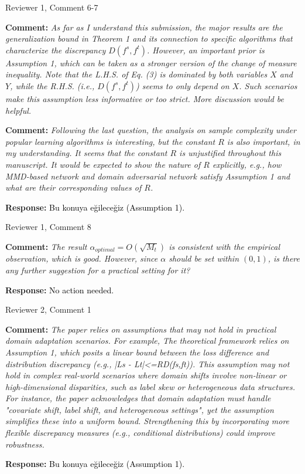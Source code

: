 \documentclass[11pt]{article}
\newcommand{\ReviewerText}[1]{%
    \begin{tcolorbox}[
        enhanced, frame hidden, colback=revbg,
        left=5pt, right=5pt, top=5pt, bottom=5pt, arc=2pt
    ]
        \textbf{\textcolor{revtitle}{Comment:}} 
        \itshape \textcolor{black!80}{#1}
    \end{tcolorbox}
    \vspace{0.05cm}
}
\newcommand{\AuthorResponse}[1]{%
    \begin{tcolorbox}[
        enhanced, frame hidden, colback=authbg,
        left=5pt, right=5pt, top=5pt, bottom=5pt, arc=2pt
    ]
        \textbf{\textcolor{authtitle}{Response:}} 
        \normalfont \textcolor{black}{#1}
    \end{tcolorbox}
    \vspace{0.1cm}
}
\newcommand{\AutoRevision}[1]{%
    \begin{tcolorbox}[
        enhanced, breakable,
        colback=revisionbg, frame hidden,
        borderline west={3pt}{0pt}{blue!40}, %
        left=5pt, right=5pt, top=5pt, bottom=5pt,
        arc=2pt 
    ]
        \textbf{\textcolor{blue!40!black}{Revisions in Manuscript:}}
        
        \renewcommand{\do}[1]{%
            \par\vspace{0.3cm} %
            
            {\small\bfseries\color{blue!60!black} $\hookrightarrow$ Section \ref{rev:##1}, Page \pageref{rev:##1}:}
            
            \par\nopagebreak
            \begingroup
            \itshape\small \Paste{text:##1}
            \endgroup
        }
        \docsvlist{#1} %
    \end{tcolorbox}
}
\begin{document}
\begin{ReviewCycle}{Reviewer 1, Comment 6-7}
    \ReviewerText{
        As far as I understand this submission, the major results are the generalization bound in Theorem 1 and its connection to specific algorithms that characterize the discrepancy $D(f^s,f^t)$. However, an important prior is Assumption 1, which can be taken as a stronger version of the change of measure inequality. Note that the L.H.S. of Eq. (3) is dominated by both variables $X$ and $Y$, while the R.H.S. (i.e., $D(f^s,f^t)$) seems to only depend on $X$. Such scenarios make this assumption less informative or too strict. More discussion would be helpful.
    }
    \ReviewerText{
        Following the last question, the analysis on sample complexity under popular learning algorithms is interesting, but the constant $R$ is also important, in my understanding. It seems that the constant $R$ is unjustified throughout this manuscript. It would be expected to show the nature of $R$ explicitly, e.g., how MMD-based network and domain adversarial network satisfy Assumption 1 and what are their corresponding values of $R$.
    }
    \AuthorResponse{Bu konuya eğileceğiz (Assumption 1).}
\end{ReviewCycle}

\begin{ReviewCycle}{Reviewer 1, Comment 8}
    \ReviewerText{
        The result $\alpha_{optimal}=O(\sqrt{M_t})$ is consistent with the empirical observation, which is good. However, since $\alpha$ should be set within $(0,1)$, is there any further suggestion for a practical setting for it?
    }
    \AuthorResponse{No action needed.}
\end{ReviewCycle}
\begin{ReviewCycle}{Reviewer 2, Comment 1}
    \ReviewerText{
        The paper relies on assumptions that may not hold in practical domain adaptation scenarios. For example, The theoretical framework relies on Assumption 1, which posits a linear bound between the loss difference and distribution discrepancy (e.g., |Ls - Lt|<=RD(fs,ft)). This assumption may not hold in complex real-world scenarios where domain shifts involve non-linear or high-dimensional disparities, such as label skew or heterogeneous data structures. For instance, the paper acknowledges that domain adaptation must handle "covariate shift, label shift, and heterogeneous settings", yet the assumption simplifies these into a uniform bound. Strengthening this by incorporating more flexible discrepancy measures (e.g., conditional distributions) could improve robustness.
    }
    \AuthorResponse{Bu konuya eğileceğiz (Assumption 1).}
\end{ReviewCycle}
\end{document}

